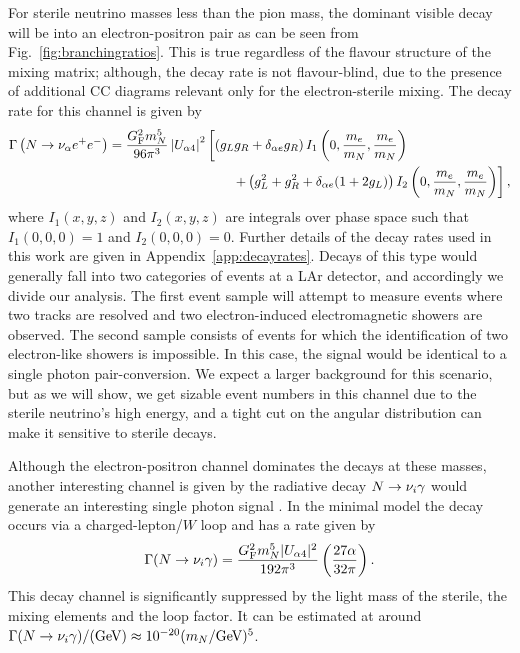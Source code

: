 \documentclass[11pt, a4paper]{article}
\newcommand{\reffig}[1]{Fig.~\ref{#1}}
\newcommand{\refapp}[1]{Appendix~\ref{#1}}
\def\ster{\ensuremath N}
\begin{document}
For sterile neutrino masses less than the pion mass, the dominant visible decay
will be into an electron-positron pair as can be seen from
\reffig{fig:branchingratios}. This is true regardless of the flavour structure
of the mixing matrix; although, the decay rate is not flavour-blind, due to the
presence of additional CC diagrams relevant only for the electron-sterile
mixing. The decay rate for this channel is given by 
%
\begin{align*} \Gamma\left(\ster\to \nu_\alpha e^+e^-\right) =
\frac{G_\text{F}^2m_\ster^5}{96\pi^3}\left|U_{\alpha 4}\right|^2&\left[\left( g_Lg_R + \delta_{\alpha e}g_R\right)I_1\left(0,\frac{m_e}{m_\ster}, \frac{
m_e}{m_\ster}\right)\right.\\ 
&\left.\qquad + \left(g_L^2 + g_R^2 + \delta_{\alpha e}(1+2g_L)\right)I_2\left(0,\frac{m_e}{m_\ster},\frac{m_e}{m_\ster}\right)\right],  \end{align*}
%
where $I_1(x,y,z)$ and $I_2(x,y,z)$ are integrals over phase space such that $I_1(0,0,0) = 1$ and $I_2(0,0,0) = 0$. Further details of the decay rates used in this work are given in
\refapp{app:decayrates}.
%
Decays of this type would generally fall into two categories of events at a LAr
detector, and accordingly we divide our analysis. The first event sample will
attempt to measure events where two tracks are resolved and two
electron-induced electromagnetic showers are observed.
%
The second sample consists of events for which the identification of two
electron-like showers is impossible. In this case, the signal would be
identical to a single photon pair-conversion. We expect a larger background for
this scenario, but as we will show, we get sizable event numbers in this
channel due to the sterile neutrino's high energy, and a tight cut on the
angular distribution can make it sensitive to sterile decays.

Although the electron-positron channel dominates the decays at these masses,
another interesting channel is given by the radiative decay
$\ster\to\nu_i\gamma$ would generate an interesting single photon signal
\cite{PhysRevD.25.766}. In the minimal model the decay occurs via a
charged-lepton/$W$ loop and has a rate given by
%
\[ \Gamma(\ster\to\nu_i\gamma) = \frac{G_\text{F}^2m_\ster^5 |U_{\alpha
4}|^2}{192 \pi^3} \left( \frac{27 \alpha}{32 \pi} \right). \]
%
This decay channel is significantly suppressed by the light mass of the
sterile, the mixing elements and the loop factor. It can be estimated at
around $\Gamma(\ster\to\nu_i\gamma)/(\text{GeV}) \approx 10^{-20}
(m_\ster/\text{GeV})^5$.  
\end{document}
